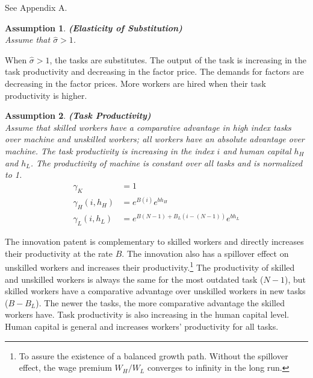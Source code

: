 \documentclass[12pt]{article}
\newtheorem{assumption}{Assumption}
\begin{document}
 See Appendix A.

\begin{assumption}{\bf (Elasticity of Substitution)} \\

Assume that $\hat{\sigma}>1$.
\end{assumption}

When $\hat{\sigma}>1$, the tasks are substitutes. The output of the task is increasing in the task productivity and decreasing in the factor price. The demands for factors are decreasing in the factor prices. More workers are hired when their task productivity is higher. 


\begin{assumption}{\bf (Task Productivity)} \\

Assume that skilled workers have a comparative advantage in high index tasks over machine and unskilled workers; all workers have an absolute advantage over machine. The task productivity is increasing in the index $i$ and human capital $h_H$ and $h_L$. The productivity of machine is constant over all tasks and is normalized to 1. 
\begin{align*}
\gamma_K &= 1 \\
\gamma_H(i,h_H) &=e^{B(i)} e^{bh_H} \\
\gamma_L(i,h_L) &= e^{B(N-1)+B_L(i-(N-1))} e^{bh_L}
\end{align*}
\end{assumption}

The innovation patent is complementary to skilled workers and directly increases their productivity at the rate $B$. The innovation also has a spillover effect on unskilled workers and increases their productivity.\footnote{To assure the existence of a balanced growth path. Without the spillover effect, the wage premium $W_H/W_L$ converges to infinity in the long run.} The productivity of skilled and unskilled workers is always the same for the most outdated task ($N-1$), but skilled workers have a comparative advantage over unskilled workers in new tasks ($B-B_L$). The newer the tasks, the more comparative advantage the skilled workers have. Task productivity is also increasing in the human capital level. Human capital is general and increases workers' productivity for all tasks.  
\end{document}
